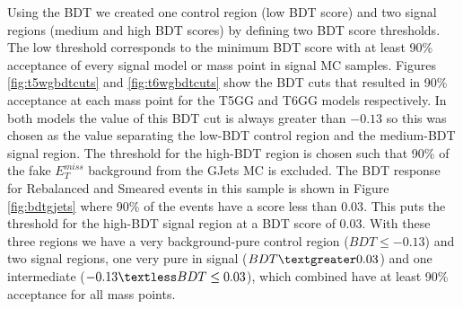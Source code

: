 Using the BDT we created one control region (low BDT score) and two signal regions (medium and high BDT scores) by defining two BDT score thresholds.  The low threshold corresponds to the minimum BDT score with at least 90\% acceptance of every signal model or mass point in signal MC samples.  Figures \ref{fig:t5wgbdtcuts} and \ref{fig:t6wgbdtcuts} show the BDT cuts that resulted in 90\% acceptance at each mass point for the T5GG and T6GG models respectively.  In both models the value of this BDT cut is always greater than $-0.13$ so this was chosen as the value separating the low-BDT control region and the medium-BDT signal region.  The threshold for the high-BDT region is chosen such that 90\% of the fake $E^{miss}_T$ background from the GJets MC is excluded.  The BDT response for Rebalanced and Smeared events in this sample is shown in Figure \ref{fig:bdtgjets} where 90\% of the events have a score less than $0.03$.  This puts the threshold for the high-BDT signal region at a BDT score of $0.03$.  With these three regions we have a very background-pure control region ($BDT \leq -0.13$) and two signal regions, one very pure in signal ($BDT\textgreater 0.03$) and one intermediate ($-0.13 \textless BDT \leq 0.03$), which combined have at least 90\% acceptance for all mass points.

